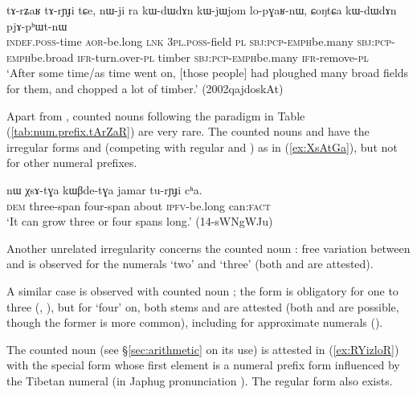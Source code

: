\begin{exe}
\ex \label{ex:tArZaR.tArYJi}
\gll tɤ-rʑaʁ tɤ-rɲɟi tɕe, nɯ-ji ra kɯ-dɯ\redp{}dɤn kɯ-jɯ\redp{}jom lo-pɣaʁ-nɯ, ɕoŋtɕa kɯ-dɯ\redp{}dɤn pjɤ-pʰɯt-nɯ \\
\textsc{indef}.\textsc{poss}-time \textsc{aor}-be.long \textsc{lnk} \textsc{3pl}.\textsc{poss}-field \textsc{pl} \textsc{sbj}:\textsc{pcp}-\textsc{emph}\redp{}be.many \textsc{sbj}:\textsc{pcp}-\textsc{emph}\redp{}be.broad \textsc{ifr}-turn.over-\textsc{pl} timber \textsc{sbj}:\textsc{pcp}-\textsc{emph}\redp{}be.many \textsc{ifr}-remove-\textsc{pl} \\
\glt `After some time/as time went on, [those people] had ploughed many broad fields for them, and chopped a lot of timber.' (2002qajdoskAt)
\end{exe}

Apart from  , counted nouns following the paradigm in Table (\ref{tab:num.prefix.tArZaR}) are very rare. The counted nouns  and  have the irregular forms  and  (competing with regular  and ) as in (\ref{ex:XsAtGa}), but not for other numeral prefixes. 

\begin{exe}
\ex \label{ex:XsAtGa}
\gll nɯ χsɤ-tɣa kɯβde-tɣa jamar tu-rɲɟi cʰa. \\
\textsc{dem} three-span four-span about \textsc{ipfv}-be.long can:\textsc{fact} \\
\glt `It can grow three or four spans long.' (14-sWNgWJu) 
\end{exe}

Another unrelated irregularity concerns the counted noun : free variation between  and  is observed for the numerals `two' and `three' (both  and  are attested).

A similar case is observed with counted noun ; the form  is obligatory for one to three (, ), but for `four' on, both stems  and  are attested (both  and  are possible, though the former is more common), including for approximate numerals ().  

The counted noun  (see §\ref{sec:arithmetic} on its use) is attested in (\ref{ex:RYizloR}) with the special form  whose first element is a numeral prefix form  influenced by the Tibetan numeral  (in Japhug pronunciation ). The regular form  also exists.
 
